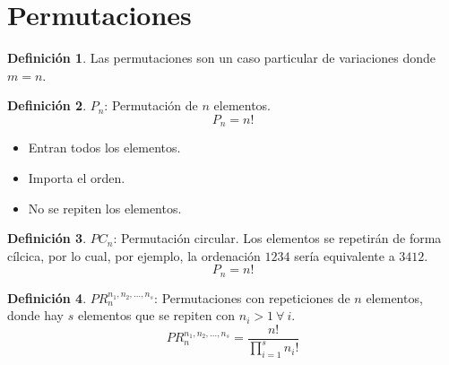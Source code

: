 \documentclass[10pt,a4paper]{article}
\theoremstyle{definition}
\newtheorem{definition}{Definición}[section]
\begin{document}
\section{Permutaciones}
\begin{definition}
Las permutaciones son un caso particular de variaciones donde $m=n$.
\end{definition}
\begin{definition}
$P_n$: Permutación de $n$ elementos.
\[P_n = n!\]
\begin{itemize}
	\item Entran todos los elementos.
	\item Importa el orden.
	\item No se repiten los elementos.
	\end{itemize}
\end{definition}
\begin{definition}
	$PC_n$: Permutación circular. Los elementos se repetirán de forma cílcica, por lo cual, por ejemplo, la ordenación $1234$ sería equivalente a $3412$.
	\[P_n = n!\]
\end{definition}
\begin{definition}
	$PR_n^{n_1,n_2,\dots,n_s}$: Permutaciones con repeticiones de $n$ elementos, donde hay $s$ elementos que se repiten con $n_i>1\:\forall\:i$.
	\[PR_n^{n_1,n_2,\dots,n_s}=\frac{n!}{\prod_{i=1}^s n_i!}\]
\end{definition}
\end{document}

